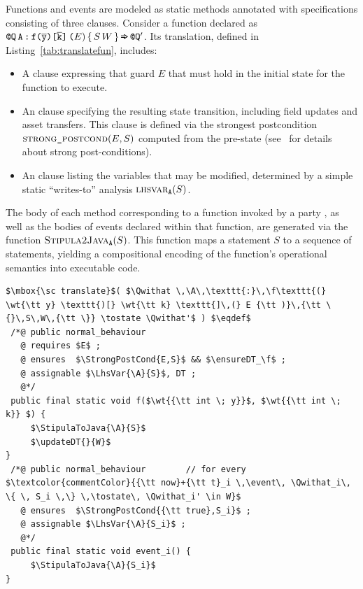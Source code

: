 Functions and events are modeled as static {\Java} methods annotated
with {\JML} specifications consisting of three clauses. Consider a
{\Stipula} function declared as
$ \mbox{{\tt @}}{\tt Q} \,{\tt A}\,\texttt{:}\,\texttt{f}\texttt{(} \overline{\tt y} \texttt{)[}
\overline{\tt k} \texttt{]\,(} E {\tt )}\,{\tt \{}\,S\,W\,{\tt \}} \,\mbox{{\tt =\hspace{-2.5pt}>}}\,
\mbox{{\tt @}}{\tt Q}' $. Its translation, defined in
Listing~\ref{tab:translatefun}, includes:
%
\begin{itemize}
\item A  clause expressing that guard $E$ that must hold
  in the initial state for the function to execute.
\item An  clause specifying the resulting state
  transition, including field updates and asset transfers. This clause
  is defined via the strongest postcondition $\mbox{{\sc strong}{\tt \_}{\sc postcond}}(E,S)$
  computed from the pre-state (see~\cite{KeYTutorial24} for details
  about strong post-conditions).
\item An  clause listing the variables that may be
  modified, determined by a simple static ``writes-to'' analysis
  $\mbox{\sc lhsvar}_{{\tt A}}(S)$.
\end{itemize}

The body of each method corresponding to a {\Stipula} function invoked
by a party {\A}, as well as the bodies of events declared within that
function, are generated via the function $\mbox{\sc Stipula2Java}_{{\tt A}}(S)$. This
function maps a {\Stipula} statement $S$ to a sequence of {\Java}
statements, yielding a compositional encoding of the function's
operational semantics into executable {\Java} code.

{\small
\begin{lstlisting}[frame=none,numbers=none,language={[JML]Java},mathescape=true,caption={The {\sc translate} function for {\Stipula} functions and events},label={tab:translatefun}]
$\mbox{\sc translate}$( $\Qwithat \,\A\,\texttt{:}\,\f\texttt{(} \wt{\tt y} \texttt{)[} \wt{\tt k} \texttt{]\,(} E {\tt )}\,{\tt \{}\,S\,W\,{\tt \}} \tostate \Qwithat'$ ) $\eqdef$
 /*@ public normal_behaviour
   @ requires $E$ ;
   @ ensures  $\StrongPostCond{E,S}$ && $\ensureDT_\f$ ; 
   @ assignable $\LhsVar{\A}{S}$, DT ;
   @*/
 public final static void f($\wt{{\tt int \; y}}$, $\wt{{\tt int \; k}} $) {
     $\StipulaToJava{\A}{S}$ 
     $\updateDT{}{W}$    
}
 /*@ public normal_behaviour        // for every $\textcolor{commentColor}{{\tt now}+{\tt t}_i \,\event\, \Qwithat_i\, \{ \, S_i \,\} \,\tostate\, \Qwithat_i' \in W}$
   @ ensures  $\StrongPostCond{{\tt true},S_i}$ ;
   @ assignable $\LhsVar{\A}{S_i}$ ;
   @*/
 public final static void event_i() {
     $\StipulaToJava{\A}{S_i}$ 
}
\end{lstlisting}
}

